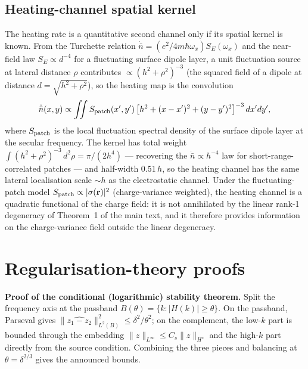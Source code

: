\documentclass[12pt,a4paper]{article}
\begin{document}
\subsection{Heating-channel spatial kernel}

The heating rate is a quantitative second channel only if its spatial
kernel is known.  From the Turchette relation
$\dot{\bar n}=(e^2/4m\hbar\omega_x)S_E(\omega_x)$ and the near-field law
$S_E\propto d^{-4}$ for a fluctuating surface dipole layer, a unit
fluctuation source at lateral distance $\rho$ contributes
$\propto(h^2+\rho^2)^{-3}$ (the squared field of a dipole at distance
$d=\sqrt{h^2+\rho^2}$), so the heating map is the convolution
\begin{equation}
\dot{\bar n}(x,y) \propto \iint S_{\rm patch}(x',y')\,
    \bigl[h^2+(x-x')^2+(y-y')^2\bigr]^{-3}\,dx'dy',
\end{equation}
where $S_{\rm patch}$ is the local fluctuation spectral density of the
surface dipole layer at the secular frequency.  The kernel has total
weight $\int(h^2+\rho^2)^{-3}\,d^2\rho=\pi/(2h^4)$ --- recovering the
$\dot{\bar n}\propto h^{-4}$ law for short-range-correlated patches ---
and half-width $0.51\,h$, so the heating channel has the same lateral
localisation scale $\sim h$ as the electrostatic channel.  Under the
fluctuating-patch model $S_{\rm patch}\propto|\sigma(\mathbf{r})|^2$
(charge-variance weighted), the heating channel is a quadratic
functional of the charge field: it is not annihilated by the linear
rank-1 degeneracy of Theorem~1 of the main text, and it therefore
provides information on the charge-variance field outside the linear
degeneracy.

\section{Regularisation-theory proofs}

\textbf{Proof of the conditional (logarithmic) stability theorem.}
Split the frequency axis at the passband $B(\theta)=\{k:|H(k)|\ge\theta\}$.
On the passband, Parseval gives
$\|\widehat{z_1-z_2}\|_{L^2(B)}^2\le\delta^2/\theta^2$; on the complement,
the low-$k$ part is bounded through the embedding
$\|z\|_{L^\infty}\le C_s\|z\|_{H^s}$ and the high-$k$ part directly from
the source condition.  Combining the three pieces and balancing at
$\theta=\delta^{2/3}$ gives the announced bounds.
\end{document}
